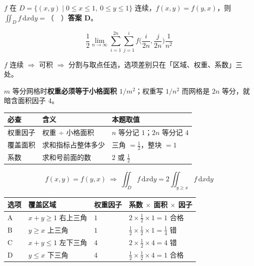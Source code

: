 \documentclass[10pt,a4paper]{ctexart}
\begin{document}

$f$ 在 $D=\{(x,y)\mid 0\le x\le 1,\ 0\le y\le 1\}$ 连续，$f(x,y)=f(y,x)$，则 $\iint_D f\,\mathrm dx\mathrm dy=$（　）\textbf{答案 D}。

\[
\frac12\lim_{n\to\infty}\sum_{i=1}^{2n}\sum_{j=1}^{i}f\Big(\frac{i}{2n},\frac{j}{2n}\Big)\frac{1}{n^2}
\]

$f$ 连续 $\Rightarrow$ 可积 $\Rightarrow$ 分割与取点任选，选项差别只在「区域、权重、系数」三处。


$m$ 等分网格时\textbf{权重必须等于小格面积 $1/m^2$}；权重写 $1/n^2$ 而网格是 $2n$ 等分，就暗含面积因子 $4$。

\begin{center}\small
\begin{tabularx}{\linewidth}{@{}>{\raggedright\arraybackslash}X>{\raggedright\arraybackslash}X>{\raggedright\arraybackslash}X@{}}
\toprule
必查 & 含义 & 本题取值 \\
\midrule
权重因子 & 权重 ÷ 小格面积 & $n$ 等分记 $1$；$2n$ 等分记 $4$ \\
覆盖面积 & 求和指标占整体多少 & 三角 $=\tfrac12$，整块 $=1$ \\
系数 & 求和号前面的数 & $2$ 或 $\tfrac12$ \\
\bottomrule
\end{tabularx}
\end{center}



\[
f(x,y)=f(y,x)\ \Longrightarrow\ \iint_D f\,\mathrm dx\mathrm dy=2\iint_{y\ge x}f\,\mathrm dx\mathrm dy
\]



\begin{center}\small
\begin{tabularx}{\linewidth}{@{}>{\raggedright\arraybackslash}X>{\raggedright\arraybackslash}X>{\raggedright\arraybackslash}X>{\raggedright\arraybackslash}X@{}}
\toprule
选项 & 覆盖区域 & 权重因子 & 系数 $\times$ 面积 $\times$ 因子 \\
\midrule
A & $x+y\ge 1$ 右上三角 & $1$ & $2\times\tfrac12\times1=1$ 合格 \\
B & $y\ge x$ 上三角 & $1$ & $\tfrac12\times\tfrac12\times1=\tfrac14$ 错 \\
C & $x+y\le 1$ 左下三角 & $4$ & $2\times\tfrac12\times4=4$ 错 \\
D & $y\le x$ 下三角 & $4$ & $\tfrac12\times\tfrac12\times4=1$ 合格 \\
\bottomrule
\end{tabularx}
\end{center}
\end{document}
